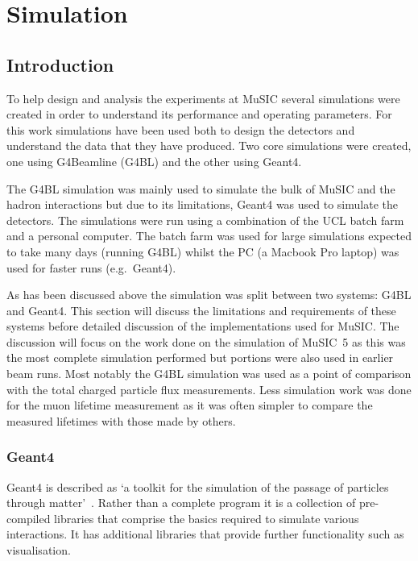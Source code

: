 \part{Simulation} %
\label{prt:simulation}
\chapter{Introduction} %
\label{cha:sim_introduction}
To help design and analysis the experiments at MuSIC several simulations were created in order to understand its performance and operating parameters. For this work simulations have been used both to design the detectors and understand the data that they have produced. Two core simulations were created, one using G4Beamline (G4BL) and the other using Geant4. 

The G4BL simulation was mainly used to simulate the bulk of MuSIC and the hadron interactions but due to its limitations, Geant4 was used to simulate the detectors. The simulations were run using a combination of the UCL batch farm and a personal computer. The batch farm was used for large simulations expected to take many days (running G4BL) whilst the PC (a Macbook Pro laptop) was used for faster runs (e.g.\ Geant4).

As has been discussed above the simulation was split between two systems: G4BL and Geant4. This section will discuss the limitations and requirements of these systems before detailed discussion of the implementations used for MuSIC. The discussion will focus on the work done on the simulation of MuSIC~5 as this was the most complete simulation performed but portions were also used in earlier beam runs. Most notably the G4BL simulation was used as a point of comparison with the total charged particle flux measurements. Less simulation work was done for the muon lifetime measurement as it was often simpler to compare the measured lifetimes with those made by others.

\section{Geant4} %
\label{sec:geant4}
Geant4 is described as `a toolkit for the simulation of the passage of particles through matter'~\cite{Geant4 REF}. Rather than a complete program it is a collection of pre-compiled libraries that comprise the basics required to simulate various interactions. It has additional libraries that provide further functionality such as visualisation. 

